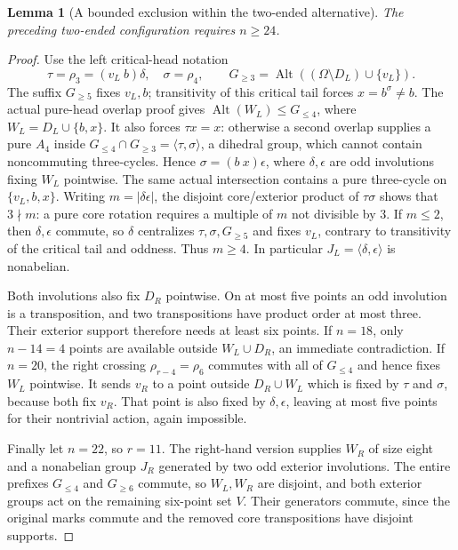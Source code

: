 \documentclass[11pt,a4paper]{article}
\newtheorem{lemma}[proposition]{Lemma}
\newcommand{\gen}[1]{\langle#1\rangle}
\newcommand{\Alt}{\operatorname{Alt}}
\begin{document}
\begin{lemma}[A bounded exclusion within the two-ended alternative]
The preceding two-ended configuration requires $n\ge24$.
\end{lemma}
\begin{proof}
Use the left critical-head notation
\[
 \tau=\rho_3=(v_L\ b)\delta,\quad \sigma=\rho_4,
 \qquad G_{\ge3}=\Alt((\Omega\setminus D_L)\cup\{v_L\}).
\]
The suffix $G_{\ge5}$ fixes $v_L,b$; transitivity of this critical
tail forces $x=b^\sigma\ne b$. The actual pure-head overlap proof
gives $\Alt(W_L)\le G_{\le4}$, where $W_L=D_L\cup\{b,x\}$.
It also forces $\tau x=x$: otherwise a second overlap supplies a
pure $A_4$ inside
$G_{\le4}\cap G_{\ge3}=\gen{\tau,\sigma}$, a dihedral group,
which cannot contain noncommuting three-cycles.
Hence $\sigma=(b\ x)\epsilon$, where $\delta,\epsilon$ are odd
involutions fixing $W_L$ pointwise. The same actual intersection
contains a pure three-cycle on $\{v_L,b,x\}$.
Writing $m=|\delta\epsilon|$, the disjoint core/exterior product
of $\tau\sigma$ shows that $3\nmid m$: a pure core rotation
requires a multiple of $m$ not divisible by $3$.
If $m\le2$, then $\delta,\epsilon$ commute, so $\delta$
centralizes $\tau,\sigma,G_{\ge5}$ and fixes $v_L$, contrary to
transitivity of the critical tail and oddness. Thus $m\ge4$.
In particular $J_L=\gen{\delta,\epsilon}$ is nonabelian.

Both involutions also fix $D_R$ pointwise. On at most five points
an odd involution is a transposition, and two transpositions have
product order at most three. Their exterior support therefore
needs at least six points. If $n=18$, only $n-14=4$ points are
available outside $W_L\cup D_R$, an immediate contradiction.
If $n=20$, the right crossing $\rho_{r-4}=\rho_6$ commutes
with all of $G_{\le4}$ and hence fixes $W_L$ pointwise.
It sends $v_R$ to a point outside $D_R\cup W_L$ which is fixed
by $\tau$ and $\sigma$, because both fix $v_R$.
That point is also fixed by $\delta,\epsilon$, leaving at most
five points for their nontrivial action, again impossible.

Finally let $n=22$, so $r=11$. The right-hand version supplies
$W_R$ of size eight and a nonabelian group $J_R$ generated by
two odd exterior involutions. The entire prefixes $G_{\le4}$
and $G_{\ge6}$ commute, so $W_L,W_R$ are disjoint, and both
exterior groups act on the remaining six-point set $V$.
Their generators commute, since the original marks commute and
the removed core transpositions have disjoint supports.


\end{proof}
\end{document}
